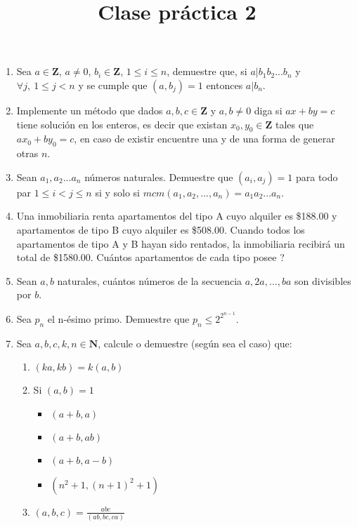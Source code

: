 \documentclass{article}
\begin{document}
\title{Clase pr\'actica 2}
\maketitle

\begin{enumerate}
    \item Sea $a \in \mathbf{Z}$, $a \neq 0$, $b_i \in \mathbf{Z}$, $1 \leq i \leq n$, demuestre que, si $a | b_1b_2...b_n$ y $\forall j,~ 1 \leq j < n$ y se cumple que $(a, b_j) = 1$ entonces $a | b_n$.
    \item Implemente un m\'etodo que dados $a,b,c \in \mathbf{Z}$ y $a,b \neq 0$ diga si $ax + by =c$ tiene soluci\'on en los enteros, es decir que existan $x_0, y_0 \in \mathbf{Z}$ tales que $ax_0 + by_0 = c$, en caso de existir encuentre una y de una forma de generar otras $n$.
    \item Sean $a_1, a_2 ... a_n$ n\'umeros naturales. Demuestre que $(a_i, a_j) = 1$ para todo par $1 \leq i < j \leq n$ si y solo si $mcm(a_1, a_2,...,a_n) = a_1a_2...a_n$.
    \item Una inmobiliaria renta apartamentos del tipo A cuyo alquiler es \$188.00 y apartamentos de tipo B cuyo alquiler es \$508.00. Cuando todos los apartamentos de tipo A y B hayan sido rentados, la inmobiliaria recibir\'a un total de \$1580.00. Cu\'antos apartamentos de cada tipo posee ?
    \item Sean $a,b$ naturales, cu\'antos n\'umeros de la secuencia $a, 2a, ..., ba$ son divisibles por $b$.
    \item Sea $p_n$ el n-\'esimo primo. Demuestre que $p_n \leq 2^{2^{n-1}}$.
    \item Sea $a,b,c,k,n \in \mathbf{N}$, calcule o demuestre (seg\'un sea el caso) que:
    \begin{enumerate}
        \item $(ka, kb) = k (a,b)$
        \item Si $(a,b) = 1$
        \begin{itemize}
            \item $(a+b, a)$
            \item $(a+b, ab)$
            \item $(a+b, a-b)$
            \item $(n^2 +1, (n+1)^2 +1)$
        \end{itemize}
        \item $(a,b,c) = \frac{abc}{(ab,bc,ca)}$
    \end{enumerate}
\end{enumerate}
\end{document}
